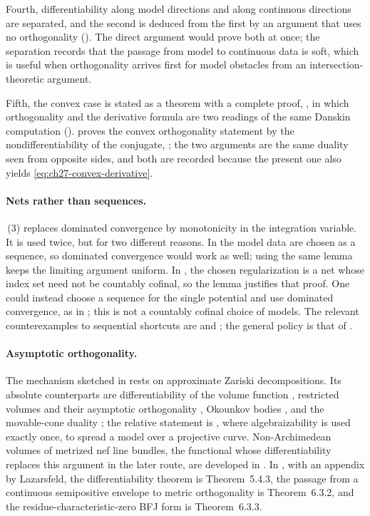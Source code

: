 Fourth, differentiability along model directions and along continuous
directions are separated, and the second is deduced from the first by an
argument that uses no orthogonality
().  The direct argument would prove both at once;
the separation records that the passage from model to continuous data is
soft, which is useful when orthogonality arrives first for model obstacles
from an intersection-theoretic argument.

Fifth, the convex case is stated as a theorem with a complete proof,
, in which orthogonality and the
derivative formula are two readings of the same Danskin computation
().   proves the
convex orthogonality statement by the nondifferentiability of the conjugate,
; the two arguments are the
same duality seen from opposite sides, and both are recorded because the
present one also yields \eqref{eq:ch27-convex-derivative}.

\paragraph{Nets rather than sequences.}
\,(3) replaces dominated convergence by
monotonicity in the integration variable.  It is used twice, but for two
different reasons.  In  the
model data are chosen as a sequence, so dominated convergence would work as
well; using the same lemma keeps the limiting argument uniform.  In
, the chosen regularization is a net whose
index set need not be countably cofinal, so the lemma justifies that proof.
One could instead choose a sequence for the single potential and use
dominated convergence, as in \cite[Corollary~7.3]{BFJ15}; this is not a
countably cofinal choice of models.  The relevant counterexamples to
sequential shortcuts are  and
; the general policy is that of
.

\paragraph{Asymptotic orthogonality.}
The mechanism sketched in  rests on
approximate Zariski decompositions.  Its absolute counterparts are
differentiability of the volume function \cite{BFJ09}, restricted volumes
and their asymptotic orthogonality \cite{ELMNP09}, Okounkov bodies
\cite{LM09}, and the movable-cone duality \cite{BDPP13}; the relative
statement is \cite[Appendix~A]{BFJ15}, where algebraizability is used
exactly once, to spread a model over a projective curve.  Non-Archimedean
volumes of metrized nef line bundles, the functional whose
differentiability replaces this argument in the later route, are developed
in \cite{BGM21}.  In \cite{BGGJKM20}, with an appendix by Lazarsfeld, the
differentiability theorem is Theorem~5.4.3, the passage from a continuous
semipositive envelope to metric orthogonality is Theorem~6.3.2, and the
residue-characteristic-zero BFJ form is Theorem~6.3.3.

